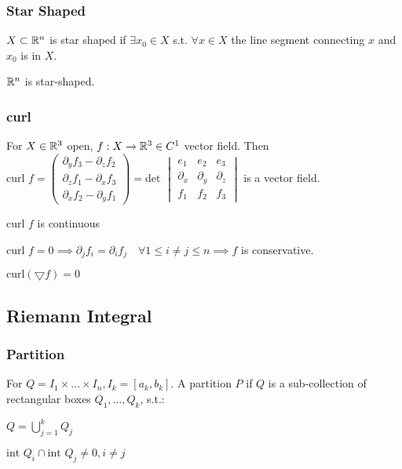 \subsubsection{Star Shaped}
$X \subset \mathbb{R}^n$ is star shaped if $\exists x_0 \in X$ s.t. $\forall x \in X$ the line segment connecting $x$ and $x_0$ is in $X$.

\begin{compactitem}
    \item $\mathbb{R}^n$ is star-shaped.
\end{compactitem}

\subsubsection{curl}
For $X \in \mathbb{R}^3$ open, $f: X \to \mathbb{R}^3 \in C^1$ vector field. Then $\text{curl } f =
\begin{pmatrix}
    \partial_y f_3 - \partial_z f_2\\
    \partial_z f_1 - \partial_x f_3\\
    \partial_x f_2 - \partial_y f_1
\end{pmatrix} = \text{det }
\begin{vmatrix}
    e_1 & e_2 & e_3\\
    \partial_x & \partial_y & \partial_z\\
    f_1 & f_2 & f_3
\end{vmatrix}$ is a vector field.

\begin{compactitem}
    \item $\text{curl } f$ is continuous
    \item $\text{curl } f = 0 \implies \partial_j f_i = \partial_i f_j \quad \forall 1 \le i \neq j \le n \implies f$ is conservative.
    \item $\text{curl}(\bigtriangledown f) = 0$

\end{compactitem}

\subsection{Riemann Integral}

\subsubsection{Partition}
For $Q = I_1 \times \dots \times I_n, I_k = [a_k, b_k]$. A partition $P$ if $Q$ is a sub-collection of rectangular boxes $Q_1, \dots , Q_k$, s.t.:
\begin{inparaitem}
    \item $Q = \bigcup_{j = 1}^k Q_j$
    \item $\text{int } Q_i \cap \text{int }Q_j \neq 0, i \neq j$
\end{inparaitem}

